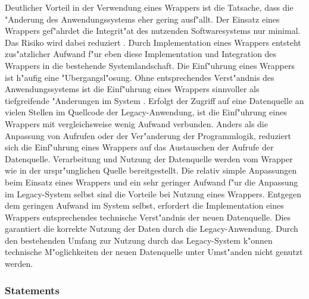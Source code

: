 %
%
%

Deutlicher Vorteil in der Verwendung eines Wrappers ist die Tatsache, dass die "Anderung des Anwendungssystems eher gering ausf"allt. Der Einsatz eines Wrappers gef"ahrdet die Integrit"at des nutzenden Softwaresystems nur minimal. Das Risiko wird dabei reduziert \citep{henrard-2002}. 
\lb
Durch Implementation eines Wrappers entsteht zus"atzlicher Aufwand f"ur eben diese Implementation und Integration des Wrappers in die bestehende Systemlandschaft. Die Einf"uhrung eines Wrappers ist h"aufig eine "Ubergangsl"osung. Ohne entsprechendes Verst"andnis des Anwendungssystems ist die Einf"uhrung eines Wrappers sinnvoller als tiefgreifende "Anderungen im System \citep{henrard-2002}.
\lb
Erfolgt der Zugriff auf eine Datenquelle an vielen Stellen im Quellcode der Legacy-Anwendung, ist die Einf"uhrung eines Wrappers mit vergleichsweise wenig Aufwand verbunden. Anders als die Anpassung von Aufrufen oder der Ver"anderung der Programmlogik, reduziert sich die Einf"uhrung eines Wrappers auf das Austauschen der Aufrufe der Datenquelle. Verarbeitung und Nutzung der Datenquelle werden vom Wrapper wie in der urspr"unglichen Quelle bereitgestellt. Die relativ simple Anpassungen beim Einsatz eines Wrappers und ein sehr geringer Aufwand f"ur die Anpassung im Legacy-System selbst sind die Vorteile bei Nutzung eines Wrappers. Entgegen dem geringen Aufwand im System selbst, erfordert die Implementation eines Wrappers entsprechendes technische Verst"andnis der neuen Datenquelle. Dies garantiert die korrekte Nutzung der Daten durch die Legacy-Anwendung. Durch den bestehenden Umfang zur Nutzung durch das Legacy-System k"onnen technische M"oglichkeiten der neuen Datenquelle unter Umst"anden nicht genutzt werden.

\subsubsection{Statements}

